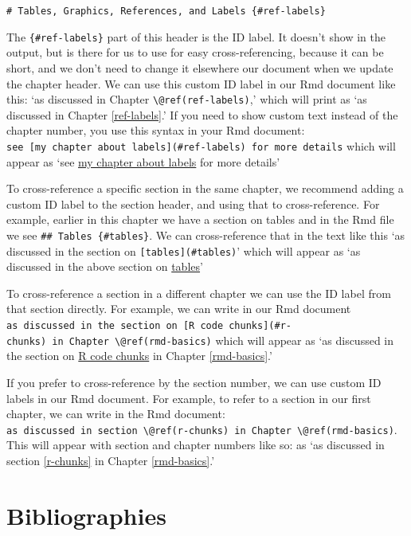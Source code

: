 \documentclass [11pt, proquest] {uwthesis}[2015/03/03]
\begin{document}
\texttt{\#\ Tables,\ Graphics,\ References,\ and\ Labels\ \{\#ref-labels\}}

The \texttt{\{\#ref-labels\}} part of this header is the ID label. It doesn't show in the output, but is there for us to use for easy cross-referencing, because it can be short, and we don't need to change it elsewhere our document when we update the chapter header. We can use this custom ID label in our Rmd document like this: `as discussed in Chapter \texttt{\textbackslash{}@ref(ref-labels)},' which will print as `as discussed in Chapter \ref{ref-labels}.' If you need to show custom text instead of the chapter number, you use this syntax in your Rmd document: \texttt{see\ {[}my\ chapter\ about\ labels{]}(\#ref-labels)\ for\ more\ details} which will appear as `see \protect\hyperlink{ref-labels}{my chapter about labels} for more details'

To cross-reference a specific section in the same chapter, we recommend adding a custom ID label to the section header, and using that to cross-reference. For example, earlier in this chapter we have a section on tables and in the Rmd file we see \texttt{\#\#\ Tables\ \{\#tables\}}. We can cross-reference that in the text like this `as discussed in the section on \texttt{{[}tables{]}(\#tables)}' which will appear as `as discussed in the above section on \protect\hyperlink{tables}{tables}'

To cross-reference a section in a different chapter we can use the ID label from that section directly. For example, we can write in our Rmd document \texttt{as\ discussed\ in\ the\ section\ on\ {[}R\ code\ chunks{]}(\#r-chunks)\ in\ Chapter\ \textbackslash{}@ref(rmd-basics)} which will appear as `as discussed in the section on \protect\hyperlink{r-chunks}{R code chunks} in Chapter \ref{rmd-basics}.'

If you prefer to cross-reference by the section number, we can use custom ID labels in our Rmd document. For example, to refer to a section in our first chapter, we can write in the Rmd document: \texttt{as\ discussed\ in\ section\ \textbackslash{}@ref(r-chunks)\ in\ Chapter\ \textbackslash{}@ref(rmd-basics)}. This will appear with section and chapter numbers like so: as `as discussed in section \ref{r-chunks} in Chapter \ref{rmd-basics}.'

\hypertarget{bibliographies}{%
\section{Bibliographies}\label{bibliographies}}
\end{document}
